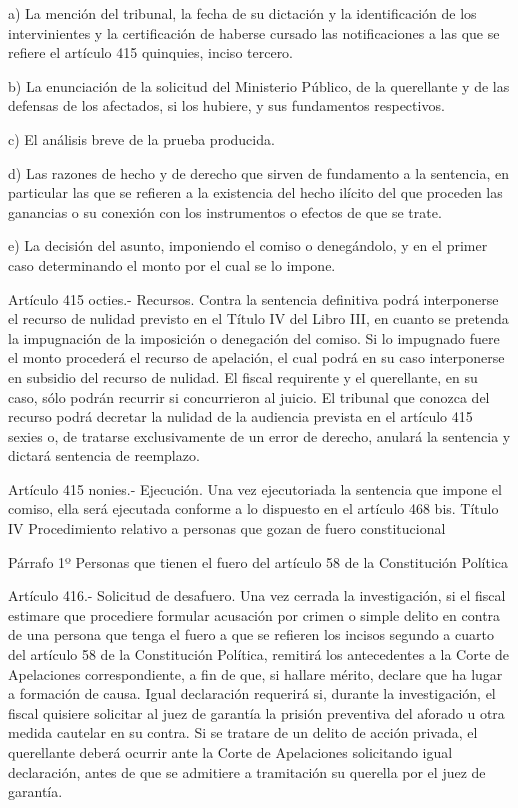     a) La mención del tribunal, la fecha de su dictación y la identificación de los intervinientes y la certificación de haberse cursado las notificaciones a las que se refiere el artículo 415 quinquies, inciso tercero.

    b) La enunciación de la solicitud del Ministerio Público, de la querellante y de las defensas de los afectados, si los hubiere, y sus fundamentos respectivos.

    c) El análisis breve de la prueba producida.

    d) Las razones de hecho y de derecho que sirven de fundamento a la sentencia, en particular las que se refieren a la existencia del hecho ilícito del que proceden las ganancias o su conexión con los instrumentos o efectos de que se trate.

    e) La decisión del asunto, imponiendo el comiso o denegándolo, y en el primer caso determinando el monto por el cual se lo impone.

    Artículo 415 octies.- Recursos. Contra la sentencia definitiva podrá interponerse el recurso de nulidad previsto en el Título IV del Libro III, en cuanto se pretenda la impugnación de la imposición o denegación del comiso. Si lo impugnado fuere el monto procederá el recurso de apelación, el cual podrá en su caso interponerse en subsidio del recurso de nulidad.
    El fiscal requirente y el querellante, en su caso, sólo podrán recurrir si concurrieron al juicio.
    El tribunal que conozca del recurso podrá decretar la nulidad de la audiencia prevista en el artículo 415 sexies o, de tratarse exclusivamente de un error de derecho, anulará la sentencia y dictará sentencia de reemplazo.

    Artículo 415 nonies.- Ejecución. Una vez ejecutoriada la sentencia que impone el comiso, ella será ejecutada conforme a lo dispuesto en el artículo 468 bis.
    Título IV
    Procedimiento relativo a personas que gozan de fuero constitucional

    Párrafo 1º Personas que tienen el fuero del artículo 58 de la Constitución Política



    Artículo 416.- Solicitud de desafuero. Una vez cerrada la investigación, si el fiscal estimare que procediere formular acusación por crimen o simple delito en contra de una persona que tenga el fuero a que se refieren los incisos segundo a cuarto del artículo 58 de la Constitución Política, remitirá los antecedentes a la Corte de Apelaciones correspondiente, a fin de que, si hallare mérito, declare que ha lugar a formación de causa.
    Igual declaración requerirá si, durante la investigación, el fiscal quisiere solicitar al juez de garantía la prisión preventiva del aforado u otra medida cautelar en su contra.
    Si se tratare de un delito de acción privada, el querellante deberá ocurrir ante la Corte de Apelaciones solicitando igual declaración, antes de que se admitiere a tramitación su querella por el juez de garantía.

